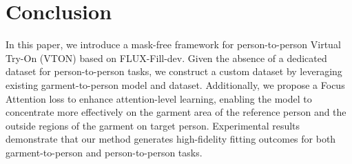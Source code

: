 \section{Conclusion}
\label{sec:conclusion}
In this paper, we introduce a mask-free framework for person-to-person Virtual Try-On (VTON) based on FLUX-Fill-dev. Given the absence of a dedicated dataset for person-to-person tasks, we construct a custom dataset by leveraging existing garment-to-person model and dataset. Additionally, we propose a Focus Attention loss to enhance attention-level learning, enabling the model to concentrate more effectively on the garment area of the reference person and the outside regions of the garment on target person. Experimental results demonstrate that our method generates high-fidelity fitting outcomes for both garment-to-person and person-to-person tasks.